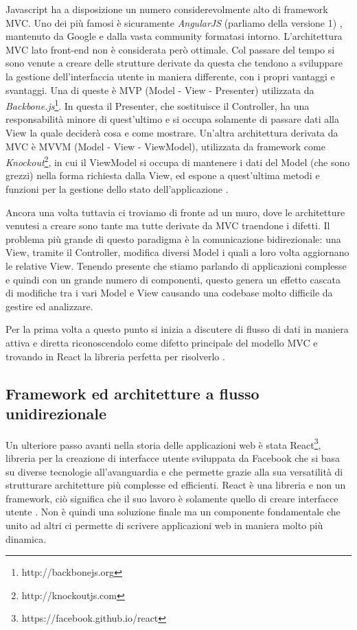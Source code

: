 Javascript ha a disposizione un numero considerevolmente alto di framework MVC. Uno dei più famosi è sicuramente \textit{AngularJS} (parliamo della versione 1) \cite{AngularOfficialDocumentation}, mantenuto da Google e dalla vasta community formatasi intorno.
L'architettura MVC lato front-end non è considerata però ottimale. Col passare del tempo si sono venute a creare delle strutture derivate da questa che tendono a sviluppare la gestione dell'interfaccia utente in maniera differente, con i propri vantaggi e svantaggi. Una di queste è MVP (Model - View - Presenter) utilizzata da \textit{Backbone.js}\footnote{http://backbonejs.org}. In questa il Presenter, che sostituisce il Controller, ha una responsabilità minore di quest'ultimo e si occupa solamente di passare dati alla View la quale deciderà cosa e come mostrare. Un'altra architettura derivata da MVC è MVVM (Model - View - ViewModel), utilizzata da framework come \textit{Knockout}\footnote{http://knockoutjs.com}, in cui il ViewModel si occupa di mantenere i dati del Model (che sono grezzi) nella forma richiesta dalla View, ed espone a quest'ultima metodi e funzioni per la gestione dello stato dell'applicazione \cite{ChauhanFrontendArchitectures}.

Ancora una volta tuttavia ci troviamo di fronte ad un muro, dove le architetture venutesi a creare sono tante ma tutte derivate da MVC traendone i difetti. Il problema più grande di questo paradigma è la comunicazione bidirezionale: una View, tramite il Controller, modifica diversi Model i quali a loro volta aggiornano le relative View. Tenendo presente che stiamo parlando di applicazioni complesse e quindi con un grande numero di componenti, questo genera un effetto cascata di modifiche tra i vari Model e View causando una codebase molto difficile da gestire ed analizzare. 

Per la prima volta a questo punto si inizia a discutere di flusso di dati in maniera attiva e diretta riconoscendolo come difetto principale del modello MVC e trovando in React la libreria perfetta per risolverlo \cite{SalihefendicFluxVsMVC}.

\subsection{Framework ed architetture a flusso unidirezionale}
Un ulteriore passo avanti nella storia delle applicazioni web è stata React\footnote{https://facebook.github.io/react}, libreria per la creazione di interfacce utente sviluppata da Facebook che si basa su diverse tecnologie all'avanguardia e che permette grazie alla sua versatilità di strutturare architetture più complesse ed efficienti.
React è una libreria e non un framework, ciò significa che il suo lavoro è solamente quello di creare interfacce utente \cite{BunaReactIsTheNewFrontend}. Non è quindi una soluzione finale ma un componente fondamentale che unito ad altri ci permette di scrivere applicazioni web in maniera molto più dinamica.

